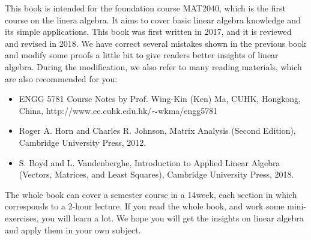 This book is intended for the foundation course MAT2040, which is the first course on the linera algebra. It aims to cover basic linear algebra knowledge and its simple applications. This book was first written in 2017, and it is reviewed and revised in 2018. We have correct several mistakes shown in the previous book and modify some proofs a little bit to give readers better insights of linear algebra.  During the modification, we also refer to many reading materials, which are also recommended for you:
\begin{itemize}
\item
ENGG 5781 Course Notes by Prof. Wing-Kin (Ken) Ma,  CUHK, Hongkong, China,  http://www.ee.cuhk.edu.hk/$\sim$wkma/engg5781
\item
Roger A. Horn and Charles R. Johnson, Matrix Analysis (Second Edition), Cambridge University Press, 2012.
\item
S. Boyd and L. Vandenberghe, Introduction to Applied Linear Algebra (Vectors, Matrices, and Least Squares), Cambridge University Press, 2018.
\end{itemize}
The whole book can cover a semester course in a 14week, each section in which corresponds to a 2-hour lecture. If you read the whole book, and work some mini-exercises, you will learn a lot. We hope you will get the insights on linear algebra and apply them in your own subject.



